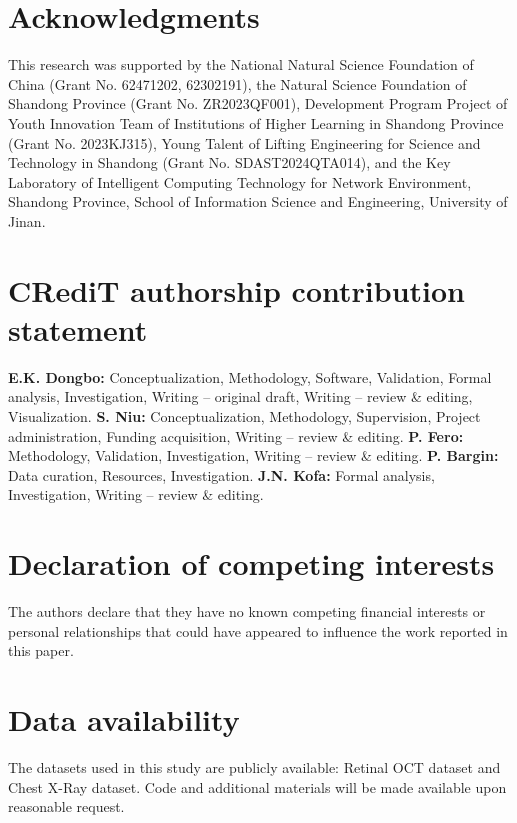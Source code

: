\documentclass[preprint,12pt]{elsarticle}
\begin{document}

\section*{Acknowledgments}
This research was supported by the National Natural Science Foundation of China (Grant No. 62471202, 62302191), the Natural Science Foundation of Shandong Province (Grant No. ZR2023QF001), Development Program Project of Youth Innovation Team of Institutions of Higher Learning in Shandong Province (Grant No. 2023KJ315), Young Talent of Lifting Engineering for Science and Technology in Shandong (Grant No. SDAST2024QTA014), and the Key Laboratory of Intelligent Computing Technology for Network Environment, Shandong Province, School of Information Science and Engineering, University of Jinan.

\section*{CRediT authorship contribution statement}
\textbf{E.K. Dongbo:} Conceptualization, Methodology, Software, Validation, Formal analysis, Investigation, Writing – original draft, Writing – review \& editing, Visualization.
\textbf{S. Niu:} Conceptualization, Methodology, Supervision, Project administration, Funding acquisition, Writing – review \& editing.
\textbf{P. Fero:} Methodology, Validation, Investigation, Writing – review \& editing.
\textbf{P. Bargin:} Data curation, Resources, Investigation.
\textbf{J.N. Kofa:} Formal analysis, Investigation, Writing – review \& editing.

\section*{Declaration of competing interests}
The authors declare that they have no known competing financial interests or personal relationships that could have appeared to influence the work reported in this paper.

\section*{Data availability}
The datasets used in this study are publicly available: Retinal OCT dataset and Chest X-Ray dataset. Code and additional materials will be made available upon reasonable request.
\end{document}
